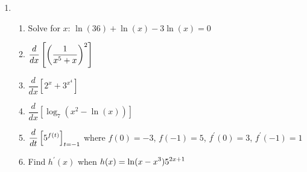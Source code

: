 \documentclass[10pt]{article}
\begin{document}
\begin{enumerate}
    \newpage%
\item[Board 4.] \,  
    \begin{enumerate}
    \item Solve for $x$: $\ln(36)+\ln(x)-3\ln(x)=0$
    \item $\displaystyle \dfrac{d}{dx}\left[ \left(\frac{1}{x^5 + x}\right)^2\right]$
    \item $\dfrac{d}{dx}[2^x + 3^{x^4}]$
    \item $\dfrac{d}{dx} \left [\log_7\left( x^2-\ln(x)\right)\right]$
    \item $\displaystyle \dfrac{d}{dt}\left[ 5^{f(t)}\right]_{t=-1}$ where $f(0)=-3$, $f(-1)=5$, $f^{\prime}(0)= 3$, $f^{\prime}(-1)= 1$ 
    \item Find $h^{\prime}(x)$ when $\displaystyle h(x)=\ln(x-x^3)5^{2x+1}$
    \end{enumerate}     
%


\end{enumerate}
\end{document}
